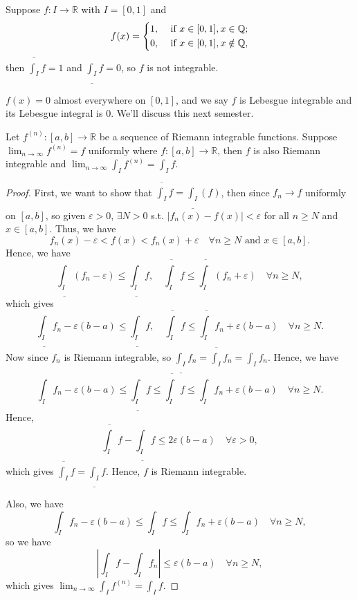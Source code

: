 \begin{eg}
    Suppose \(f: I \to \mathbb{R} \) with \(I = [0, 1]\) and   
    \[
        f(x) = \begin{dcases}
            1, &\text{ if } x \in [0, 1], x \in \mathbb{Q}   ;\\
            0, &\text{ if } x \in [0, 1], x \notin \mathbb{Q} ,
        \end{dcases}
    \] then \(\overline{\int _I} f = 1 \) and \(\underline{\int _I} f = 0\), so \(f\) is not integrable. 
    \begin{note}
        \(f(x) = 0\) almost everywhere on \([0, 1]\), and we say \(f\) is Lebesgue integrable and its Lebesgue integral is \(0\). We'll discuss this next semester.    
    \end{note}   
\end{eg}

\begin{theorem} \label{thm: uniformly conv preserve Riemann integrable}
    Let \(f^{(n)}: [a, b] \to \mathbb{R} \) be a sequence of Riemann integrable functions. Suppose \(\lim_{n \to \infty} f^{(n)} = f \) uniformly where \(f: [a, b] \to \mathbb{R} \), then \(f\) is also Riemann integrable and \(\lim_{n \to \infty} \int _I f^{(n)} = \int _I f\). 
\end{theorem}
\begin{proof}
    First, we want to show that  \(\overline{\int _I}f = \underline{\int _I}(f) \), then since \(f_n \to f\) uniformly on \([a, b]\), so given \(\varepsilon > 0\), \(\exists N > 0\) s.t. \(\left\vert f_n(x) - f(x) \right\vert < \varepsilon  \) for all \(n \ge N\) and \(x \in [a, b]\). Thus, we have 
    \[
        f_n(x) - \varepsilon < f(x) < f_n(x) + \varepsilon \quad \forall n \ge N \text{ and } x \in [a, b].
    \]      
    Hence, we have 
    \[
        \underline{\int _I} (f_n - \varepsilon ) \le \underline{\int _I} f, \quad \overline{\int _I} f \le \overline{\int _I} (f_n + \varepsilon ) \quad \forall n \ge N, 
    \]  which gives 
    \[
        \underline{\int _I} f_n - \varepsilon (b - a) \le \underline{\int _I} f, \quad \overline{\int _I} f \le \overline{\int _I} f_n + \varepsilon (b - a) \quad \forall n \ge N.  
    \] Now since \(f_n\) is Riemann integrable, so \(\underline{\int _I} f_n = \overline{\int _I} f_n = \int _I f_n \). Hence, we have 
    \[
        \int_I f_n - \varepsilon (b - a) \le \underline{\int _I} f \le \overline{\int _I} f \le \int _I f_n + \varepsilon (b - a) \quad \forall n \ge N.
    \] 
    Hence, 
    \[
        \overline{\int _I} f - \underline{\int _I} f \le 2 \varepsilon (b - a) \quad \forall \varepsilon > 0,
    \] which gives \(\overline{\int _I} f = \underline{\int _I} f \). Hence, \(f\) is Riemann integrable. 
    
    Also, we have 
    \[
       \int_I f_n - \varepsilon (b - a) \le \int _I f \le \int _I f_n + \varepsilon (b - a) \quad \forall n \ge N,
    \] so we have 
    \[
        \left\vert \int _I f - \int _I f_n \right\vert \le \varepsilon (b - a) \quad \forall n \ge N, 
    \] which gives \(\lim_{n \to \infty} \int _I f^{(n)} = \int _I f \). 
\end{proof}

